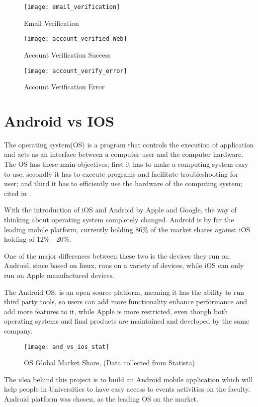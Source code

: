\begin{appendices}
\begin{figure}[h!]
	\centering
	\texttt{[image: email\_verification]}
	\caption{Email Verification}
\end{figure}

\begin{figure}[h!]
	\centering
	\texttt{[image: account\_verified\_Web]}
	\caption{Account Verification Success}
\end{figure}

\begin{figure}[h!]
	\centering
	\texttt{[image: account\_verify\_error]}
	\caption{Account Verification Error}
\end{figure}

\pagebreak

\section{Android vs IOS}
\label{androidvsios}
The operating system(OS) is a program that controls the execution of application and acts as an interface between a computer user and the computer hardware. The OS has these main objectives; first it has to make a computing system easy to use, secondly it has to execute programs and facilitate troubleshooting for user; and third it has to efficiently use the hardware of the computing system; \cite{stallings2001operating} cited in \cite{novac2017comparative}.

With the introduction of iOS and Android by Apple and Google, the way of thinking about operating system completely changed.
Android is by far the leading mobile platform, currently holding 86\% of the market shares against iOS holding of 12\% - 20\%.

One of the major differences between these two is the devices they run on. Android, since based on linux, runs on a variety of devices, while iOS can only run on Apple manufactured devices.

The Android OS, is an open source platform, meaning it has the ability to run third party tools, so users can add more functionality enhance performance and add more features to it, while Apple is more restricted, even though both operating systems and final products are maintained and developed by the same company. 

\begin{figure}[h]
	\centering
	\texttt{[image: and\_vs\_ios\_stat]}	
	\caption{OS Global Market Share, (Data collected from Statista)}
	\label{fib:and_vs_ios_stat}
\end{figure}
The idea behind this project is to build an Android mobile application which will help people in Universities to have easy access to events activities on the faculty. Android platform was chosen, as the leading OS on the market.
\hfill

\end{appendices}
